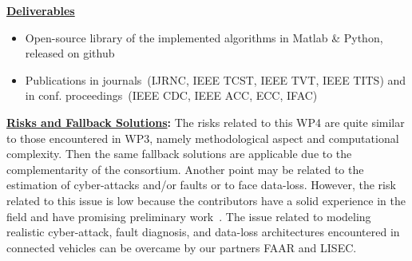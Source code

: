 \documentclass[a4paper,11pt]{article}
\begin{document}
\begin{itemize}[leftmargin=.2in,noitemsep,nolistsep]

\begin{tcolorbox}[breakable, enhanced,  colback=yellow!2!white,
title = \bf Deliverables$-$Risks and Fallback Solutions, coltitle= black, colbacktitle=yellow!7!white, halign title=center]

{ \bf \underline{Deliverables}}

\begin{itemize}[leftmargin=.2in,noitemsep,nolistsep]
\item Open-source library of the implemented algorithms in Matlab \& Python, released on github
\item Publications in journals~(IJRNC, IEEE TCST, IEEE TVT, IEEE TITS) and in conf. proceedings~(IEEE CDC, IEEE ACC, ECC, IFAC) %
\end{itemize}

{ \bf \underline{Risks and Fallback Solutions}:} The risks related to this WP4 are quite similar to those encountered in WP3, namely methodological aspect and computational complexity. Then the same fallback solutions are applicable due to the complementarity of the consortium. Another point may be related to the estimation of cyber-attacks and/or faults or to face data-loss. However, the risk related to this issue is low because the contributors have a solid experience in the field and have promising preliminary work~\cite{Jeon_10.1115/DSCC2019-9096,ichalal2019unknown}. The issue related to modeling realistic cyber-attack, fault diagnosis, and data-loss architectures encountered in connected vehicles can be overcame by our partners FAAR and LISEC.


\end{tcolorbox}
\end{itemize}
\end{document}
